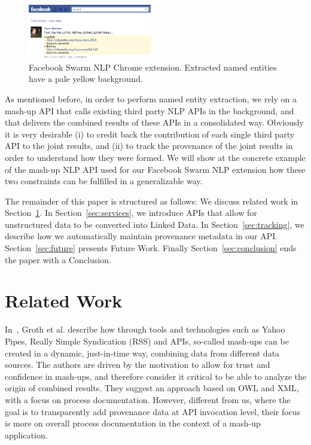 \documentclass[conference]{IEEEtran}
\begin{document}
\begin{figure}[htb!]
  \centering
    \includegraphics[width=0.48\textwidth]{facebook-swarm-nlp.png}
  \caption{Facebook Swarm NLP Chrome extension. Extracted named entities have a pale yellow background.}     
  \label{fig:facebook}
\end{figure}

As mentioned before, in order to perform named entity extraction, we rely on a mash-up API that calls existing third party NLP APIs in the background, and that delivers the combined results of these APIs in a consolidated way. Obviously it is very desirable (i) to credit back the contribution of each single third party API to the joint results, and (ii) to track the provenance of the joint results in order to understand how they were formed. We will show at the concrete example of the mash-up NLP API used for our Facebook Swarm NLP extension how these two constraints can be fulfilled in a generalizable way.

The remainder of this paper is structured as follows: We discuss related work in Section~\ref{sec:related}. In Section~\ref{sec:services}, we introduce APIs that allow for unstructured data to be converted into Linked Data. In Section~\ref{sec:tracking}, we describe how we automatically maintain provenance metadata in our API. Section~\ref{sec:future} presents Future Work. Finally Section~\ref{sec:conclusion} ends the paper with a Conclusion.

\section{Related Work}\label{sec:related}
In~\cite{Groth:2009:MPD:1462159.1462162}, Groth et al. describe how through tools and technologies such as Yahoo Pipes, Really Simple Syndication (RSS) and APIs, so-called mash-ups can be created in a dynamic, just-in-time way, combining data from different data sources. The authors are driven by the motivation to allow for trust and confidence in mash-ups, and therefore consider it critical to be able to analyze the origin of combined results. They suggest an approach based on OWL and XML, with a focus on process documentation. However, different from us, where the goal is to transparently add provenance data at API invocation level, their focus is more on overall process documentation in the context of a mash-up application.
\end{document}
